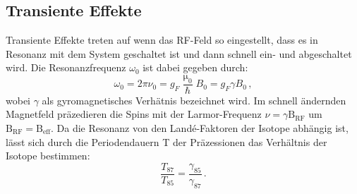 \subsection{Transiente Effekte}
Transiente Effekte treten auf wenn das RF-Feld so eingestellt, dass es in Resonanz mit dem System geschaltet ist und dann schnell ein- und abgeschaltet wird. Die Resonanzfrequenz $\omega_0$ ist dabei gegeben durch:
\begin{equation}
\omega_0=2\pi\nu_0=g_F\frac{\upmu_0}{\hbar}B_0=g_F\gamma B_0\,,
\end{equation}
wobei $\gamma$ als gyromagnetisches Verhätnis bezeichnet wird. Im schnell ändernden Magnetfeld präzedieren die Spins mit der Larmor-Frequenz $\nu=\gamma\text{B}_\text{RF}$ um $\text{B}_\text{RF}=\text{B}_\text{eff}$. Da die Resonanz von den Landé-Faktoren der Isotope abhängig ist, lässt sich durch die Periodendauern T der Präzessionen das Verhältnis der Isotope bestimmen:
\begin{equation}
  \frac{T_{87}}{T_{85}}=\frac{\gamma_{85}}{\gamma_{87}}\,.
\end{equation}

